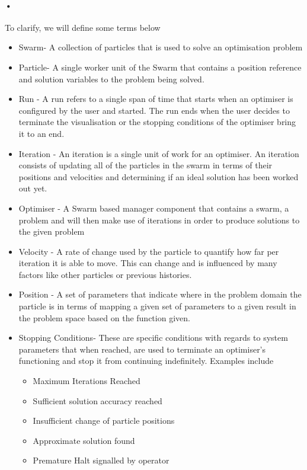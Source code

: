 \documentclass[11pt]{article}
\begin{document}
\paragraph{•}
To clarify, we will define some terms below
\begin{itemize}
\item Swarm- A collection of particles that is used to solve an optimisation problem
\item Particle- A single worker unit of the Swarm that contains a position reference and solution variables to the problem being solved.
\item Run - A run refers to a single span of time that starts when an optimiser is configured by the user and started. The run ends when the user decides to terminate the visualisation or the stopping conditions of the optimiser bring it to an end.
\item Iteration - An iteration is a single unit of work for an optimiser. An iteration consists of updating all of the particles in the swarm in terms of their positions and velocities and determining if an ideal solution has been worked out yet.
\item Optimiser - A Swarm based manager component that contains a swarm, a problem and will then make use of iterations in order to produce solutions to the given problem
\item Velocity - A rate of change used by the particle to quantify how far per iteration it is able to move. This can change and is influenced by many factors like other particles or previous histories.
\item Position - A set of parameters that indicate where in the problem domain the particle is in terms of mapping a given set of parameters to a given result in the problem space based on the function given.
\item Stopping Conditions- These are specific conditions with regards to system parameters that when reached, are used to terminate an optimiser's functioning and stop it from continuing indefinitely. Examples include
\begin{itemize}
\item Maximum Iterations Reached
\item Sufficient solution accuracy reached
\item Insufficient change of particle positions
\item Approximate solution found
\item Premature Halt signalled by operator
\end{itemize}

\end{itemize}
\end{document}
